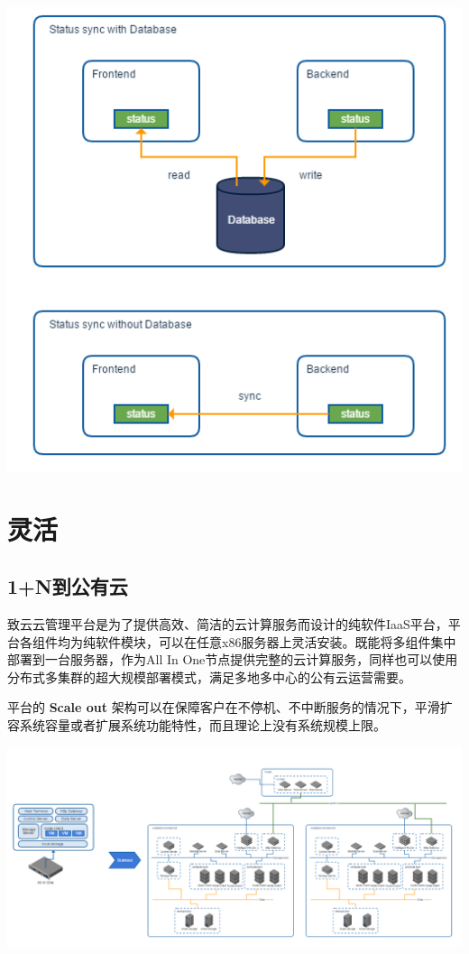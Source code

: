 \documentclass[letterpaper,10pt]{sphinxmanual}
\begin{document}
\includegraphics{2_5_non_db.png}


\chapter{灵活}
\label{index:id13}

\section{1+N到公有云}
\label{index:n}
致云云管理平台是为了提供高效、简洁的云计算服务而设计的纯软件IaaS平台，平台各组件均为纯软件模块，可以在任意x86服务器上灵活安装。既能将多组件集中部署到一台服务器，作为All In One节点提供完整的云计算服务，同样也可以使用分布式多集群的超大规模部署模式，满足多地多中心的公有云运营需要。

平台的 \textbf{Scale out} 架构可以在保障客户在不停机、不中断服务的情况下，平滑扩容系统容量或者扩展系统功能特性，而且理论上没有系统规模上限。

\includegraphics{3_1_scaleout.png}
\end{document}
